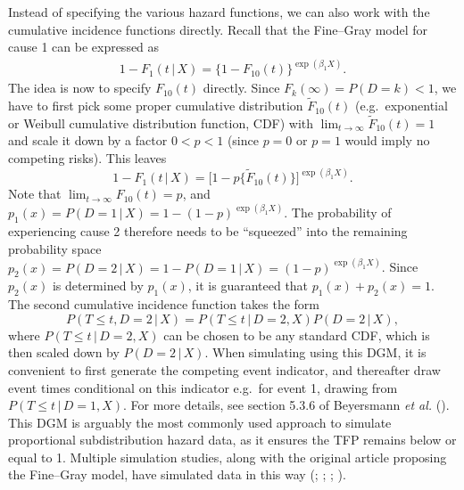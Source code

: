 \documentclass[
  letterpaper,
  paper=240mm:170mm,
  twoside=true,
  open=right,
  fontsize=10pt,
  pagesize=false,
  BCOR=15mm,
  DIV=14,
  headinclude=true,
  footinclude=false,
  headsepline=on]{scrbook}
\newcommand{\given}{\,|\,}
\begin{document}
Instead of specifying the various hazard functions, we can also work
with the cumulative incidence functions directly. Recall that the
Fine--Gray model for cause 1 can be expressed as \begin{align*}
    1 - F_1(t \given X) = \{1 - F_{10}(t)\}^{\exp(\beta_1 X)}.
\end{align*} The idea is now to specify \(F_{10}(t)\) directly. Since
\(F_k(\infty)=P(D=k)<1\), we have to first pick some proper cumulative
distribution \(\tilde{F}_{10}(t)\) (e.g.~exponential or Weibull
cumulative distribution function, CDF) with
\(\lim_{t \to \infty}\tilde{F}_{10}(t) = 1\) and scale it down by a
factor \(0< p < 1\) (since \(p = 0\) or \(p = 1\) would imply no
competing risks). This leaves \begin{equation*}
    1 - F_1(t \given X) = \big[1-p\{ \tilde{F}_{10}(t) \}\big]^{\exp(\beta_1 X)}.
\end{equation*} Note that \(\lim_{t \to \infty}F_{10}(t) = p\), and
\(p_1(x) = P(D = 1 \given X) = 1 - (1-p)^{\exp(\beta_1 X)}\). The
probability of experiencing cause 2 therefore needs to be ``squeezed''
into the remaining probability space
\(p_2(x) = P(D = 2 \given X) = 1 - P(D = 1 \given X) = (1-p)^{\exp(\beta_1 X)}\).
Since \(p_2(x)\) is determined by \(p_1(x)\), it is guaranteed that
\(p_1(x) + p_2(x) = 1\). The second cumulative incidence function takes
the form \begin{equation*}
    P(T \leq t, D=2 \given X) = P(T \leq t \given D=2, X)P(D = 2 \given X),
\end{equation*} where \(P(T \leq t \given D=2, X)\) can be chosen to be
any standard CDF, which is then scaled down by \(P(D = 2 \given X)\).
When simulating using this DGM, it is convenient to first generate the
competing event indicator, and thereafter draw event times conditional
on this indicator e.g.~for event 1, drawing from
\(P(T \leq t \given D=1, X)\). For more details, see section 5.3.6 of
Beyersmann \emph{et al.}
(). This DGM
is arguably the most commonly used approach to simulate proportional
subdistribution hazard data, as it ensures the TFP remains below or
equal to 1. Multiple simulation studies, along with the original article
proposing the Fine--Gray model, have simulated data in this way
(;
; ;
).
\end{document}
